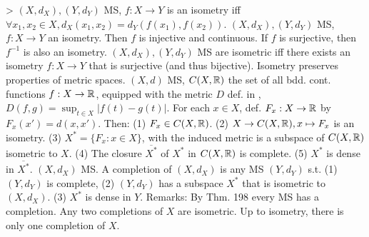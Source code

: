 > $(X, d_X), (Y, d_Y)$ MS, $f: X \to Y$ is an isometry iff
$\forall x_1, x_2 \in X, d_X(x_1, x_2) = d_Y(f(x_1), f(x_2))$.
 $(X, d_X), (Y, d_Y)$ MS, $f: X \to Y$ an isometry.
Then $f$ is injective and continuous.
If $f$ is surjective, then $f^{-1}$ is also an isometry.
 $(X, d_X), (Y, d_Y)$ MS are isometric iff
there exists an isometry $f: X \to Y$ that is surjective (and thus bijective).
 Isometry preserves properties of metric spaces.
$(X,d)$ MS, $C(X, \mathbb{R})$ the set of all bdd. cont. functions $f: X \to \mathbb{R}$,
equipped with the metric $D$ def. in ,
$D(f,g) = \sup_{t \in X} |f(t) - g(t)|$.
For each $x \in X$, def. $F_x: X \to \mathbb{R}$ by $F_x(x') = d(x, x')$. Then:
(1) $F_x \in C(X, \mathbb{R})$.
(2) $X \to C(X, \mathbb{R}), x \mapsto F_x$ is an isometry.
(3) $X^\ast = \{F_x: x \in X\}$, with the induced metric is a subspace of $C(X, \mathbb{R})$ isometric to $X$.
(4) The closure $\overline{X^\ast}$ of $X^\ast$ in $C(X, \mathbb{R})$ is complete.
(5) $X^\ast$ is dense in $\overline{X^\ast}$.
 $(X, d_X)$ MS. A completion of $(X, d_X)$ is any MS $(Y, d_Y)$ s.t.
(1) $(Y, d_Y)$ is complete,
(2) $(Y, d_Y)$ has a subspace $X^\ast$ that is isometric to $(X, d_X)$.
(3) $X^\ast$ is dense in $Y$.
Remarks: By Thm. 198 every MS has a completion.
Any two completions of $X$ are isometric.
Up to isometry, there is only one completion of $X$.
